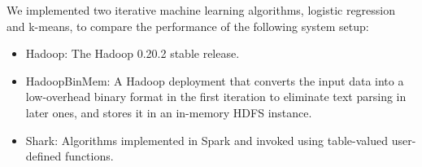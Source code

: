 \documentclass[preprint]{acm_proc_article-sp}
\newcommand{\HadoopBM}{HadoopBinMem\xspace}
\begin{document}
We implemented two iterative machine learning algorithms, logistic
regression and k-means, to compare the performance of the
following system setup:\vspace{-10pt}\begin{itemize}
  \setlength{\itemsep}{4pt}
  \setlength{\parskip}{0pt}
  \setlength{\parsep}{0pt}
  \item Hadoop: The Hadoop 0.20.2 stable release.
  \item \HadoopBM: A Hadoop deployment that converts the input
  data into a low-overhead binary format in the first iteration to eliminate
  text parsing in later ones, and stores it in an in-memory HDFS instance.
  \item Shark: Algorithms implemented in Spark and invoked using table-valued user-defined functions.
\end{itemize}
\end{document}
